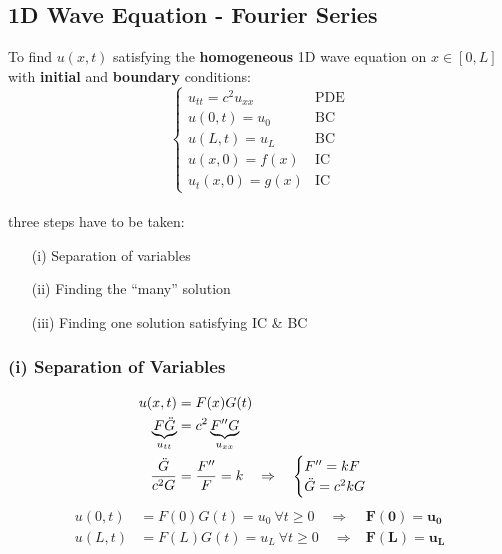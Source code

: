 \subsection{1D Wave Equation - Fourier Series}
To find $u(x,t)$ satisfying the \textbf{homogeneous} 1D wave equation on $x\in[0,L]$ with \textbf{initial} and
\textbf{boundary} conditions:
\begin{equation*}
    \begin{cases}
        u_{tt}=c^2u_{xx} & \text{PDE} \\
        u(0,t)=u_0       & \text{BC}  \\
        u(L,t)=u_L       & \text{BC}  \\
        u(x,0)=f(x)      & \text{IC}  \\
        u_t(x,0)=g(x)    & \text{IC}
    \end{cases}
\end{equation*}\\
three steps have to be taken:
\begin{itemize}
    \item[(i)] Separation of variables
    \item[(ii)] Finding the ``many'' solution
    \item[(iii)] Finding one solution satisfying IC \& BC
\end{itemize}

\subsubsection{(i) Separation of Variables}
\begin{align*}
    u(x,t)                          & =F(x)G(t)                                               \\
    \underbrace{F\ddot{G}}_{u_{tt}} & =c^2\underbrace{F''G}_{u_{xx}}                          \\
    \frac{\ddot{G}}{c^2G}           & =\frac{F''}{F}=k\hspace*{10pt}\Rightarrow\hspace*{10pt}
    \begin{cases}
        F''=kF \\
        \ddot{G}=c^2kG
    \end{cases}
\end{align*}
\begin{align*}
    u(0,t) & =F(0)G(t)=u_0\mathrm{~}\forall t\geq0\quad\Rightarrow & \mathbf{F(0)}=\mathbf{u_0} \\
    u(L,t) & =F(L)G(t)=u_L\mathrm{~}\forall t\geq0\quad\Rightarrow & \mathbf{F(L)}=\mathbf{u_L}
\end{align*}

